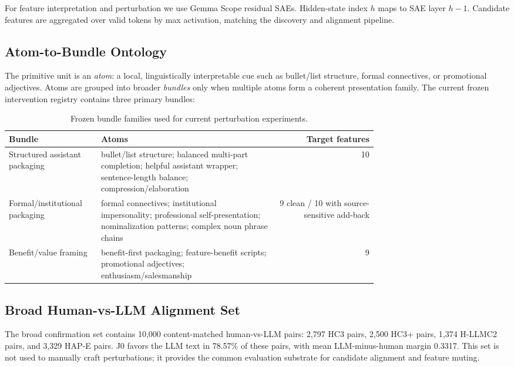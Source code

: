 \documentclass[11pt]{article}
\begin{document}
For feature interpretation and perturbation we use Gemma Scope residual SAEs.
Hidden-state index \(h\) maps to SAE layer \(h-1\). Candidate features are
aggregated over valid tokens by max activation, matching the discovery and
alignment pipeline.

\subsection{Atom-to-Bundle Ontology}

The primitive unit is an \emph{atom}: a local, linguistically interpretable cue
such as bullet/list structure, formal connectives, or promotional adjectives.
Atoms are grouped into broader \emph{bundles} only when multiple atoms form a
coherent presentation family. The current frozen intervention registry contains
three primary bundles:

\begin{table}[h]
\centering
\small
\begin{tabular}{p{0.25\linewidth}p{0.48\linewidth}r}
\toprule
Bundle & Atoms & Target features \\
\midrule
Structured assistant packaging &
bullet/list structure; balanced multi-part completion; helpful assistant
wrapper; sentence-length balance; compression/elaboration &
10 \\
Formal/institutional packaging &
formal connectives; institutional impersonality; professional
self-presentation; nominalization patterns; complex noun phrase chains &
9 clean / 10 with source-sensitive add-back \\
Benefit/value framing &
benefit-first packaging; feature-benefit scripts; promotional adjectives;
enthusiasm/salesmanship &
9 \\
\bottomrule
\end{tabular}
\caption{Frozen bundle families used for current perturbation experiments.}
\label{tab:bundles}
\end{table}

\subsection{Broad Human-vs-LLM Alignment Set}

The broad confirmation set contains 10,000 content-matched human-vs-LLM pairs:
2,797 HC3 pairs, 2,500 HC3+ pairs, 1,374 H-LLMC2 pairs, and 3,329 HAP-E pairs.
J0 favors the LLM text in 78.57\% of these pairs, with mean LLM-minus-human
margin 0.3317. This set is not used to manually craft perturbations; it
provides the common evaluation substrate for candidate alignment and feature
muting.
\end{document}
